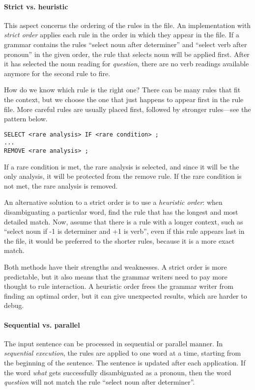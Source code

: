\paragraph{Strict vs. heuristic}

This aspect concerns the ordering of the rules in the file. An implementation with \emph{strict order} applies each rule in the order in which they appear in the file. If a grammar contains the rules ``select noun after determiner'' and ``select verb after pronoun'' in the given order, the rule that selects noun will be applied first. After it has selected the noun reading for \emph{question}, there are no verb readings available anymore for the second rule to fire.
					
How do we know which rule is the right one? There can be many rules that fit the context, but we choose the one that just happens to appear first in the rule file. More careful rules are usually placed first, followed by stronger rules---see the pattern below.

\begin{verbatim}					
SELECT <rare analysis> IF <rare condition> ;
...
REMOVE <rare analysis> ;
\end{verbatim}
If a rare condition is met, the rare analysis is selected, and since it will be the only analysis, it will be protected from the remove rule. If the rare condition is not met, the rare analysis is removed.
					
An alternative solution to a strict order is to use a \emph{heuristic order}: when disambiguating a particular word, find the rule that has the longest and most detailed match. Now, assume that there is a rule with a longer context, such as ``select noun if -1 is determiner and +1 is verb'', even if this rule appears last in the file, it would be preferred to the shorter rules, because it is a more exact match.
					
Both methods have their strengths and weaknesses. A strict order is more predictable, but it also means that the grammar writers need to pay more thought to rule interaction. A heuristic order frees the grammar writer from finding an optimal order, but it can give unexpected results, which are harder to debug.


\paragraph{Sequential vs. parallel}

The input sentence can be processed in sequential or parallel manner. In \emph{sequential execution}, the rules are applied to one word at a time, starting from the beginning of the sentence. The sentence is updated after each application. If the word \emph{what} gets successfully disambiguated as a pronoun, then the word \emph{question} will not match the rule ``select noun after determiner''.

